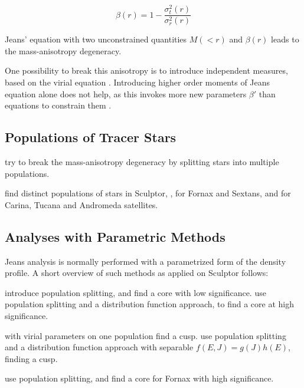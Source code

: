 \begin{equation}
\beta(r)=1-\frac{\sigma_t^2(r)}{\sigma_r^2(r)}
\end{equation}

Jeans' equation with two unconstrained quantities $M(<r)$ and
$\beta(r)$ leads to the mass-anisotropy degeneracy.

One possibility to break this anisotropy is to introduce independent
measures, based on the virial equation
\citep{RichardsonFairbairn2014}. Introducing higher order moments of
Jeans equation alone does not help, as this invokes more new
parameters $\beta'$ than equations to constrain them
\citep{RichardsonFairbairn2013}.



\subsection{Populations of Tracer Stars}
\citep{Battaglia+2008} try to break the mass-anisotropy degeneracy by
splitting stars into multiple populations.


\citep{WalkerPenarrubia2011}




\citep{Tolstoy+2004} find distinct populations of stars in Sculptor,
\citep{Battaglia+2006}, \citep{Battaglia+2011} for Fornax and Sextans,
\citep{Harbeck+2001} and \citep{Bellazzini+2001} for Carina, Tucana
and Andromeda satellites.

\subsection{Analyses with Parametric Methods}
Jeans analysis is normally performed with a parametrized form of the
density profile. A short overview of such methods as applied on Sculptor follows:

\citep{Battaglia+2008} introduce population splitting, and find a core
with low significance. \citep{AmoriscoEvans2012} use population
splitting and a distribution function approach, to find a core at high
significance.


\citep{RichardsonFairbairn2014} with virial parameters on one
population find a cusp. \citep{StrigariFrenkWhite2014} use population splitting
and a distribution function approach with separable $f(E,J)=g(J)h(E)$,
finding a cusp.


\citep{WalkerPenarrubia2011} use population
splitting, and find a core for Fornax with high significance.

